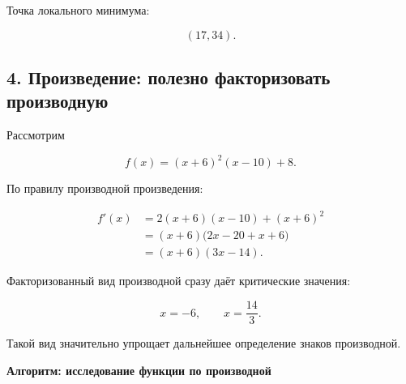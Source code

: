 \documentclass[a4paper,12pt]{article}
\begin{document}
Точка локального минимума:

\[
(17,34).
\]

\subsection*{4. Произведение: полезно факторизовать производную}

Рассмотрим

\[
f(x)
=
(x+6)^2(x-10)+8.
\]

По правилу производной произведения:

\[
\begin{aligned}
f'(x)
&=
2(x+6)(x-10)
+
(x+6)^2
\\
&=
(x+6)
\bigl(
2x-20+x+6
\bigr)
\\
&=
(x+6)(3x-14).
\end{aligned}
\]

Факторизованный вид производной сразу даёт критические значения:

\[
x=-6,
\qquad
x=\frac{14}{3}.
\]

Такой вид значительно упрощает дальнейшее определение знаков производной.

\clearpage


\thispagestyle{fancy}

\begin{center}
{\Large
\textcolor{darkaccent}{
\textbf{Алгоритм: исследование функции по производной}
}
}
\end{center}

\vspace{2mm}
\end{document}
